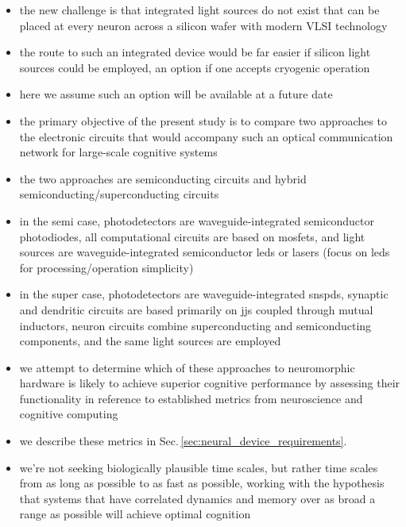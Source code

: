 \documentclass[onecolumn]{article}
\begin{document}
\begin{itemize}
\item the new challenge is that integrated light sources do not exist that can be placed at every neuron across a silicon wafer with modern VLSI technology
\item the route to such an integrated device would be far easier if silicon light sources could be employed, an option if one accepts cryogenic operation
\item here we assume such an option will be available at a future date
\item the primary objective of the present study is to compare two approaches to the electronic circuits that would accompany such an optical communication network for large-scale cognitive systems
\item the two approaches are semiconducting circuits and hybrid semiconducting/superconducting circuits
\item in the semi case, photodetectors are waveguide-integrated semiconductor photodiodes, all computational circuits are based on mosfets, and light sources are waveguide-integrated semiconductor leds or lasers (focus on leds for processing/operation simplicity)
\item in the super case, photodetectors are waveguide-integrated snspds, synaptic and dendritic circuits are based primarily on jjs coupled through mutual inductors, neuron circuits combine superconducting and semiconducting components, and the same light sources are employed
\item we attempt to determine which of these approaches to neuromorphic hardware is likely to achieve superior cognitive performance by assessing their functionality in reference to established metrics from neuroscience and cognitive computing
\item we describe these metrics in Sec.\,\ref{sec:neural_device_requirements}.
\item we're not seeking biologically plausible time scales, but rather time scales from as long as possible to as fast as possible, working with the hypothesis that systems that have correlated dynamics and memory over as broad a range as possible will achieve optimal cognition
\end{itemize}
\end{document}
